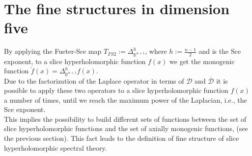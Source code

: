 \documentclass[reqno,11pt]{amsart}
\numberwithin{equation}{section}
\theoremstyle{definition}
\begin{document}
\section{The fine structures in dimension five}\label{section4}
By applying the Fueter-Sce map $T_{FS2}:= \Delta_{\mathbb{R}^{n+1}}^{h}$, where $h:=\frac{n-1}{2}$ and is the Sce exponent, to a slice hyperholomorphic function $f(x)$ we get the monogenic function
$ \breve{f}(x)= \Delta_{\mathbb{R}^{n+1}}^hf(x)$.
\\ Due to the factorization of the Laplace operator in terms of $ \mathcal{D}$ and $ \mathcal{\overline{D}}$ it is possible to apply these two operators to a slice hyperholomorphic function $f(x)$ a number of times, until we reach the maximum power of the Laplacian, i.e., the Sce exponent.
\\ This implies the possibility to build different sets of functions between the set of slice hyperholomorphic functions and the set of axially monogenic functions, (see the previous section). This fact leads to the definition of fine structure of slice hyperholomorphic spectral theory.
\end{document}
